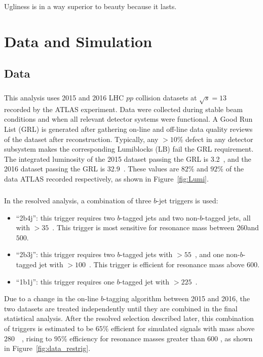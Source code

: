 \begin{savequote}[75mm]
Ugliness is in a way superior to beauty because it lasts.
\end{savequote}
\chapter{Data and Simulation}
%

\section{Data}
\label{sec:data}
\paragraph{}
This analysis uses 2015 and 2016 LHC $pp$ collision datasets at $\sqrt{s} = 13$~\TeV~ recorded by the ATLAS experiment. Data were collected during stable beam conditions and when all relevant detector systems were functional. A Good Run List (GRL) is generated after gathering on-line and off-line data quality reviews of the dataset after reconstruction. Typically, any $> 10\%$ defect in any detector subsystem makes the corresponding Lumiblocks (LB) fail the GRL requirement. The integrated luminosity of the 2015 dataset passing the GRL is 3.2~\ifb, and the 2016 dataset passing the GRL is 32.9~\ifb. These values are $82\%$ and $92\%$ of the data ATLAS recorded respectively, as shown in Figure~\ref{fig:Lumi}.

\paragraph{}
In the resolved analysis, a combination of three $b$-jet triggers is used:
\begin{itemize}
	\item ``2b4j'': this trigger requires two $b$-tagged jets and two non-$b$-tagged jets, all with \pt$>35$~\GeV. This trigger is most sensitive for resonance mass between $260$\GeV and $500$\GeV.
	\item ``2b3j'': this trigger requires two $b$-tagged jets with \pt$>55$~\GeV, and one non-$b$-tagged jet with \pt$>100$~\GeV. This trigger is efficient for resonance mass above $600$\GeV.
	\item ``1b1j'': this trigger requires one $b$-tagged jet with \pt$>225$~\GeV.
\end{itemize}
Due to a change in the on-line $b$-tagging algorithm between 2015 and 2016, the two datasets are treated independently until they are combined in the final statistical analysis. 
After the resolved selection described later, this combination of triggers is estimated to be $65\%$ efficient for simulated signals with mass above $280$~\GeV~, rising to $95\%$ efficiency for resonance masses greater than $600$ \GeV, as shown in Figure~\ref{fig:data_restrig}.

